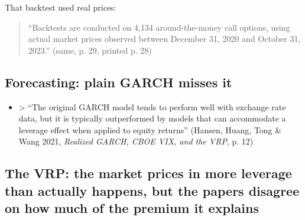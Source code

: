 \documentclass{article}
\begin{document}
\begin{itemize}
That backtest used real prices:

\begin{quote}``Backtests are conducted on 4,134 around-the-money call options, using actual market prices observed between December 31, 2020 and October 31, 2023.'' (same, p. 29, printed p. 28)\end{quote}

\end{itemize}

\subsection{Forecasting: plain GARCH misses it}

\begin{itemize}

\item

> ``The original GARCH model tends to perform well with exchange rate data, but it is typically outperformed by models that can accommodate a leverage effect when applied to equity returns'' (Hansen, Huang, Tong \& Wang 2021, \emph{Realized GARCH, CBOE VIX, and the VRP}, p. 12)

\end{itemize}

\subsection{The VRP: the market prices in more leverage than actually happens, but the papers disagree on how much of the premium it explains}
\end{document}
